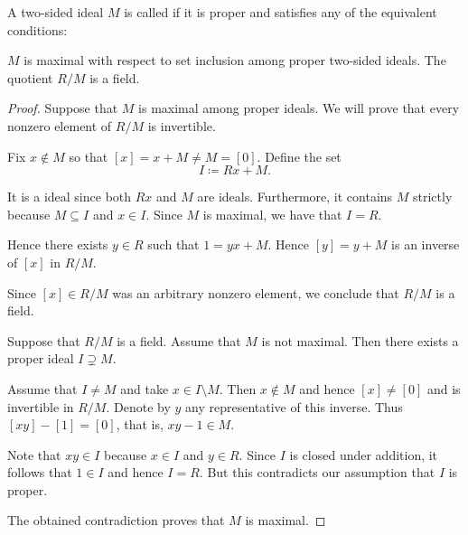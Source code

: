 \begin{definition}\label{def:maximal_ring_ideal}
  A two-sided ideal \( M \) is called  if it is proper and satisfies any of the equivalent conditions:
  \begin{defenum}
     \( M \) is maximal with respect to set inclusion among proper two-sided ideals.
     The quotient \( R / M \) is a field.
  \end{defenum}
\end{definition}
\begin{proof}
   Suppose that \( M \) is maximal among proper ideals. We will prove that every nonzero element of \( R / M \) is invertible.

  Fix \( x \not\in M \) so that \( [x] = x + M \neq M = [0] \). Define the set
  \begin{equation*}
    I \coloneqq Rx + M.
  \end{equation*}

  It is a ideal since both \( Rx \) and \( M \) are ideals. Furthermore, it contains \( M \) strictly because \( M \subseteq I \) and \( x \in I \). Since \( M \) is maximal, we have that \( I = R \).

  Hence there exists \( y \in R \) such that \( 1 = yx + M \). Hence \( [y] = y + M \) is an inverse of \( [x] \) in \( R / M \).

  Since \( [x] \in R / M \) was an arbitrary nonzero element, we conclude that \( R / M \) is a field.

   Suppose that \( R / M \) is a field. Assume that \( M \) is not maximal. Then there exists a proper ideal \( I \supsetneq M \).

  Assume that \( I \neq M \) and take \( x \in I \setminus M \). Then \( x \not\in M \) and hence \( [x] \neq [0] \) and is invertible in \( R / M \). Denote by \( y \) any representative of this inverse. Thus \( [xy] - [1] = [0] \), that is, \( xy - 1 \in M \).

  Note that \( xy \in I \) because \( x \in I \) and \( y \in R \). Since \( I \) is closed under addition, it follows that \( 1 \in I \) and hence \( I = R \). But this contradicts our assumption that \( I \) is proper.

  The obtained contradiction proves that \( M \) is maximal.
\end{proof}

